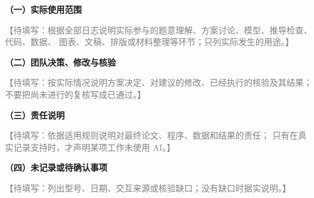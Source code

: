 \documentclass[12pt,a4paper]{ctexart}
\newcommand{\field}[1]{\textcolor{gray}{【待填写：#1】}}
\begin{document}
\begin{mdframed}[
  linewidth=1pt,
  linecolor=black,
  innertopmargin=8pt,
  innerbottommargin=8pt,
  innerleftmargin=10pt,
  innerrightmargin=10pt
]
\noindent\textbf{（一）实际使用范围}\par
\field{根据全部日志说明实际参与的题意理解、方案讨论、模型、推导检查、代码、数据、
图表、文稿、排版或材料整理等环节；只列实际发生的用途。}\par

\noindent\textbf{（二）团队决策、修改与核验}\par
\field{按实际情况说明方案决定、对建议的修改、已经执行的核验及其结果；
不要把尚未进行的复核写成已通过。}\par

\noindent\textbf{（三）责任说明}\par
\field{依据适用规则说明对最终论文、程序、数据和结果的责任；
只有在真实记录支持时，才声明某项工作未使用 AI。}\par

\noindent\textbf{（四）未记录或待确认事项}\par
\field{列出型号、日期、交互来源或核验缺口；没有缺口时据实说明。}\par
\end{mdframed}
\end{document}
